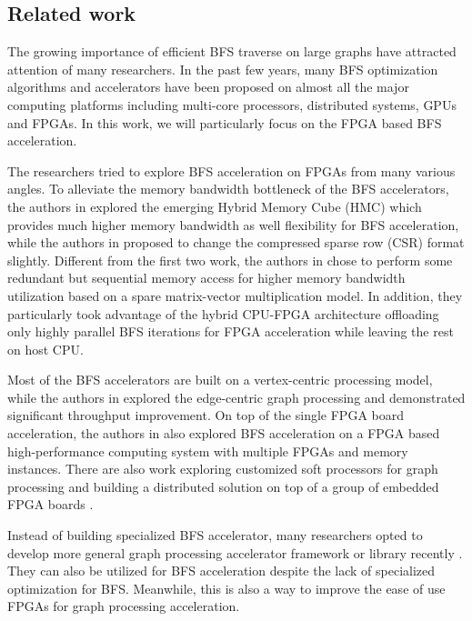 \subsection{Related work}
The growing importance of efficient BFS traverse on large graphs 
have attracted attention of many researchers. In the past few years, 
many BFS optimization algorithms and accelerators have been proposed 
on almost all the major computing platforms including multi-core processors, 
distributed systems, GPUs and FPGAs. In this work, we will 
particularly focus on the FPGA based BFS acceleration. 

The researchers tried to explore BFS acceleration 
on FPGAs from many various angles.
To alleviate the memory bandwidth bottleneck of the 
BFS accelerators, the authors in \cite{zhang2017boosting} 
explored the emerging Hybrid Memory Cube (HMC) which provides 
much higher memory bandwidth as well flexibility for BFS 
acceleration, while the authors in \cite{attia2014cygraph} 
proposed to change the compressed sparse row (CSR) format slightly. 
Different from the first two work, the authors in \cite{umuroglu2015hybrid} 
chose to perform some redundant but sequential memory access for higher memory bandwidth 
utilization based on a spare matrix-vector multiplication model.
In addition, they particularly took advantage of the 
hybrid CPU-FPGA architecture offloading only highly parallel 
BFS iterations for FPGA acceleration while leaving the rest 
on host CPU.  

Most of the BFS accelerators are built on a vertex-centric 
processing model, while the authors 
in \cite{zhou2016high} explored the edge-centric graph processing and demonstrated 
significant throughput improvement. On top of the single FPGA board acceleration, 
the authors in \cite{attia2014cygraph, betkaoui2012reconfigurable} also explored 
BFS acceleration on a FPGA based high-performance computing system with multiple 
FPGAs and memory instances. There are also work exploring customized soft processors 
for graph processing and building a distributed solution on 
top of a group of embedded FPGA boards \cite{kapre2015custom, wang2010message}.

Instead of building specialized BFS accelerator, many researchers opted to develop 
more general graph processing accelerator framework or library 
recently \cite{engelhardt2016gravf, oguntebi2016graphops, Dai2017foregraph, dai2016fpgp}. 
They can also be utilized for BFS acceleration despite the lack of 
specialized optimization for BFS. Meanwhile, this is also a way to improve 
the ease of use FPGAs for graph processing acceleration.

